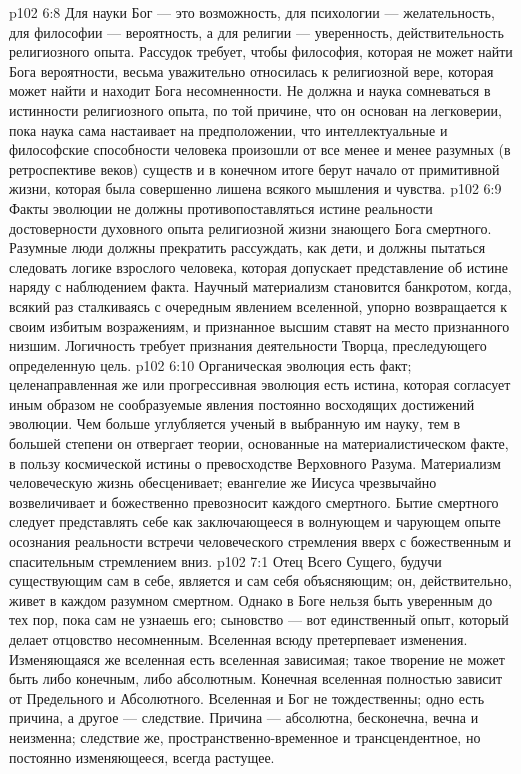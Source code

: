 \vs p102 6:8 \pc Для науки Бог --- это возможность, для психологии --- желательность, для философии --- вероятность, а для религии --- уверенность, действительность религиозного опыта. Рассудок требует, чтобы философия, которая не может найти Бога вероятности, весьма уважительно относилась к религиозной вере, которая может найти и находит Бога несомненности. Не должна и наука сомневаться в истинности религиозного опыта, по той причине, что он основан на легковерии, пока наука сама настаивает на предположении, что интеллектуальные и философские способности человека произошли от все менее и менее разумных (в ретроспективе веков) существ и в конечном итоге берут начало от примитивной жизни, которая была совершенно лишена всякого мышления и чувства.
\vs p102 6:9 Факты эволюции не должны противопоставляться истине реальности достоверности духовного опыта религиозной жизни знающего Бога смертного. Разумные люди должны прекратить рассуждать, как дети, и должны пытаться следовать логике взрослого человека, которая допускает представление об истине наряду с наблюдением факта. Научный материализм становится банкротом, когда, всякий раз сталкиваясь с очередным явлением вселенной, упорно возвращается к своим избитым возражениям, и признанное высшим ставят на место признанного низшим. Логичность требует признания деятельности Творца, преследующего определенную цель.
\vs p102 6:10 Органическая эволюция есть факт; целенаправленная же или прогрессивная эволюция есть истина, которая согласует иным образом не сообразуемые явления постоянно восходящих достижений эволюции. Чем больше углубляется ученый в выбранную им науку, тем в большей степени он отвергает теории, основанные на материалистическом факте, в пользу космической истины о превосходстве Верховного Разума. Материализм человеческую жизнь обесценивает; евангелие же Иисуса чрезвычайно возвеличивает и божественно превозносит каждого смертного. Бытие смертного следует представлять себе как заключающееся в волнующем и чарующем опыте осознания реальности встречи человеческого стремления вверх с божественным и спасительным стремлением вниз.
\vs p102 7:1 Отец Всего Сущего, будучи существующим сам в себе, является и сам себя объясняющим; он, действительно, живет в каждом разумном смертном. Однако в Боге нельзя быть уверенным до тех пор, пока сам не узнаешь его; сыновство --- вот единственный опыт, который делает отцовство несомненным. Вселенная всюду претерпевает изменения. Изменяющаяся же вселенная есть вселенная зависимая; такое творение не может быть либо конечным, либо абсолютным. Конечная вселенная полностью зависит от Предельного и Абсолютного. Вселенная и Бог не тождественны; одно есть причина, а другое --- следствие. Причина --- абсолютна, бесконечна, вечна и неизменна; следствие же, пространственно\hyp{}временное и трансцендентное, но постоянно изменяющееся, всегда растущее.
